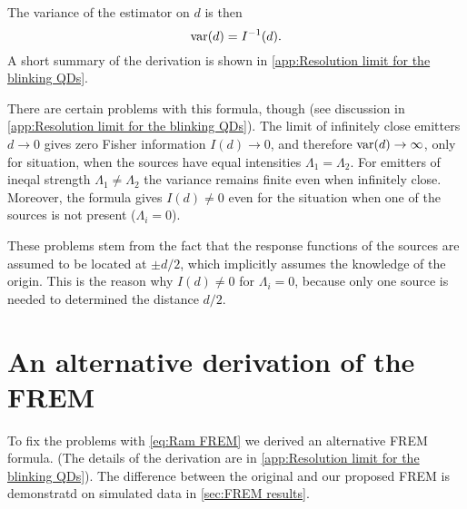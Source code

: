 The variance of the estimator on $d$ is then 
%
\begin{equation}
	\mathrm{var}(d)=I^{-1}(d).
\end{equation}
%
A short summary of the derivation is shown in \autoref{app:Resolution limit for the blinking QDs}. 

There are certain problems with this formula, though (see discussion in \autoref{app:Resolution limit for the blinking QDs}). The limit of infinitely close emitters $d\rightarrow0$ gives  zero Fisher information $I(d)\rightarrow0$, and therefore $\mathrm{var}(d)\rightarrow\infty$, only for situation, when the sources have equal intensities $\Lambda_1=\Lambda_2$. For emitters of ineqal strength $\Lambda_1\neq\Lambda_2$ the variance remains finite even when infinitely close. Moreover, the formula gives $I(d)\neq0$ even for the situation when one of the sources is not present ($\Lambda_i=0$).

These problems stem from the fact that the response functions of the sources are assumed to be located at $\pm d/2$, which implicitly assumes the knowledge of the origin. This is the reason why $I(d)\neq0$ for $\Lambda_i=0$, because only one source is needed to determined the distance $d/2$. 


\section{An alternative derivation of the FREM\label{sub:An-alternative-derivation-FREM}} 

To fix the problems with \autoref{eq:Ram FREM} we derived an alternative FREM formula. (The details of the derivation are in \autoref{app:Resolution limit for the blinking QDs}). The difference between the original and our proposed FREM is demonstratd on simulated data in \autoref{sec:FREM results}.

